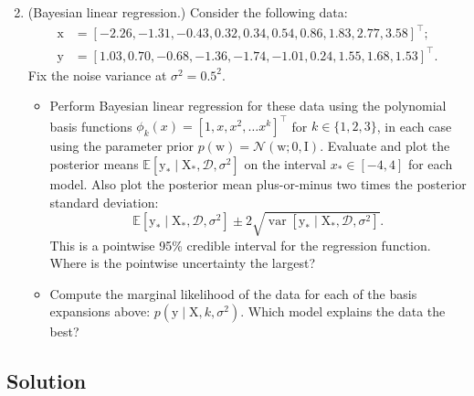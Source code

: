 \documentclass{article}
\newcommand{\given}{\mid}
\newcommand{\mc}[1]{\mathcal{#1}}
\newcommand{\data}{\mc{D}}
\newcommand{\mat}[1]{\bm{\mathrm{#1}}}
\renewcommand{\vec}[1]{\bm{\mathrm{#1}}}
\newcommand{\trans}{^\top}
\DeclareMathOperator{\var}{var}
\begin{document}
\clearpage
\begin{enumerate}
\setcounter{enumi}{1}
\item
  (Bayesian linear regression.)
  Consider the following data:
  \begin{align*}
    \vec{x}
    &=
    [-2.26, -1.31, -0.43, 0.32, 0.34, 0.54, 0.86, 1.83, 2.77, 3.58]\trans; \\
    \vec{y}
    &=
    [1.03, 0.70, -0.68, -1.36, -1.74, -1.01, 0.24, 1.55, 1.68, 1.53]\trans.
  \end{align*}
  Fix the noise variance at $\sigma^2 = 0.5^2$.
  \begin{itemize}
  \item
    Perform Bayesian linear regression for these data using the
    polynomial basis functions $\phi_k(x) = [1, x, x^2, \dotsc
      x^k]\trans$ for $k \in \{1, 2, 3\}$, in each case using the
    parameter prior $p(\vec{w}) = \mc{N}(\vec{w}; \vec{0}, \mat{I})$.
    Evaluate and plot the posterior means $\mathbb{E}[\vec{y}_\ast
      \given \mat{X}_\ast, \data, \sigma^2]$ on the interval $x_\ast
    \in [-4, 4]$ for each model.  Also plot the posterior mean
    plus-or-minus two times the posterior standard deviation:
    \begin{equation*}
      \mathbb{E}[\vec{y}_\ast \given \mat{X}_\ast, \data, \sigma^2] \pm
      2 \sqrt{\var[\vec{y}_\ast \given \mat{X}_\ast, \data, \sigma^2]}.
    \end{equation*}
    This is a pointwise 95\% credible interval for the regression
    function.  Where is the pointwise uncertainty the largest?
  \item
    Compute the marginal likelihood of the data for each of the basis
    expansions above: $p(\vec{y} \given \mat{X}, k, \sigma^2)$.  Which
    model explains the data the best?
  \end{itemize}
\end{enumerate}

\subsection*{Solution}
\end{document}
